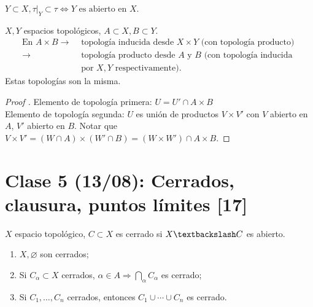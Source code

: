 \documentclass[a4paper]{report}
\begin{document}
	\begin{lemma}
		$Y \subset X, \tau|_Y \subset \tau \iff Y \text{ es abierto en } X$.
	\end{lemma}

	\begin{prop}
		$X,Y$ espacios topológicos, $A \subset X, B \subset Y$.
		\begin{align*}
			\text{En } A \times B \rightarrow & \text{ topología inducida desde } X \times Y \text{ (con topología producto) } \\
			\rightarrow & \text{ topología producto desde } A \text{ y } B \text{ (con topología inducida} \\
			& \text{ por } X,Y \text{ respectivamente)}
		.\end{align*}
		\noindent Estas topologías son la misma.
	\end{prop}

	\begin{proof}[Proof ]
		Elemento de topología primera: $U = U' \cap A \times B$ \\
		Elemento de topología segunda: $U$ es unión de productos $V \times V'$ con $V$ abierto en $A$, $V'$ abierto en $B$. Notar que $V \times V' = (W \cap A) \times (W' \cap B) = (W \times W') \cap A \times B$.
	\end{proof}

	\section{Clase 5 (13/08): Cerrados, clausura, puntos límites [17]}

	\begin{definition}
		$X$ espacio topológico, $C \subset X$ es cerrado si $X \textbackslash C$ es abierto. 
	\end{definition}

	\begin{lemma}
		\text{}
		\begin{enumerate}
			\item $X, \varnothing$ son cerrados;

			\item Si $C_{\alpha} \subset X$ cerrados, $\alpha \in A \Rightarrow \bigcap_{\alpha} C_{\alpha}$ es cerrado;

			\item Si $C_1, \dots, C_n$ cerrados, entonces $C_1 \cup \cdots \cup C_n$ es cerrado.
		\end{enumerate}
	\end{lemma}
\end{document}
